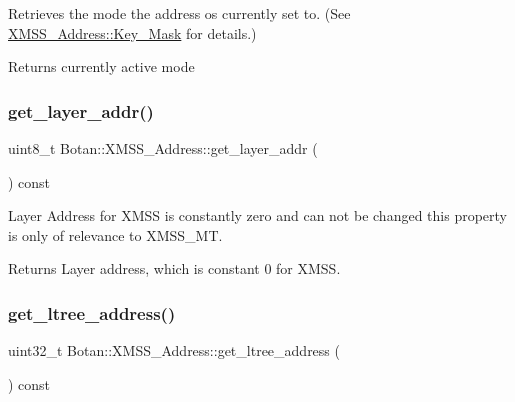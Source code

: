 Retrieves the mode the address os currently set to. (See \hyperlink{class_botan_1_1_x_m_s_s___address_a85146c0c3e049f62c413194049f501e3}{X\+M\+S\+S\+\_\+\+Address\+::\+Key\+\_\+\+Mask} for details.)

\begin{DoxyReturn}{Returns}
currently active mode 
\end{DoxyReturn}
\mbox{\label{class_botan_1_1_x_m_s_s___address_ac71959711edb3f719e371942247f2c74}} 
\subsubsection{\texorpdfstring{get\+\_\+layer\+\_\+addr()}{get\_layer\_addr()}}
{\footnotesize\ttfamily uint8\+\_\+t Botan\+::\+X\+M\+S\+S\+\_\+\+Address\+::get\+\_\+layer\+\_\+addr (\begin{DoxyParamCaption}{ }\end{DoxyParamCaption}) const\hspace{0.3cm}{\ttfamily [inline]}}

Layer Address for X\+M\+SS is constantly zero and can not be changed this property is only of relevance to X\+M\+S\+S\+\_\+\+MT.

\begin{DoxyReturn}{Returns}
Layer address, which is constant 0 for X\+M\+SS. 
\end{DoxyReturn}
\mbox{\label{class_botan_1_1_x_m_s_s___address_a67c3f3349ae7545bccf57f6e37f81849}} 
\subsubsection{\texorpdfstring{get\+\_\+ltree\+\_\+address()}{get\_ltree\_address()}}
{\footnotesize\ttfamily uint32\+\_\+t Botan\+::\+X\+M\+S\+S\+\_\+\+Address\+::get\+\_\+ltree\+\_\+address (\begin{DoxyParamCaption}{ }\end{DoxyParamCaption}) const\hspace{0.3cm}{\ttfamily [inline]}}

